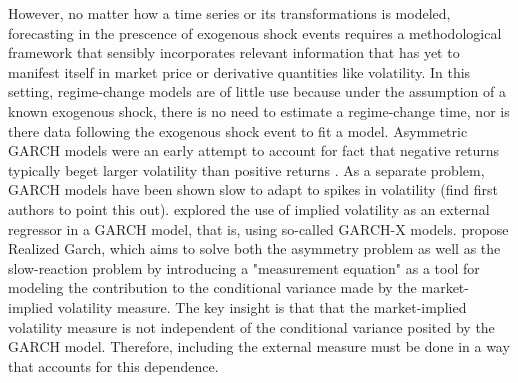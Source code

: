 \documentclass[11pt]{article}
\theoremstyle{definition}
\begin{document}

However, no matter how a time series or its transformations is modeled, forecasting in the prescence of exogenous shock events requires a methodological framework that sensibly incorporates relevant information that has yet to manifest itself in market price or derivative quantities like volatility.  In this setting, regime-change models are of little use because under the assumption of a known exogenous shock, there is no need to estimate a regime-change time, nor is there data following the exogenous shock event to fit a model.  Asymmetric GARCH models were an early attempt to account for fact that negative returns typically beget larger volatility than positive returns \citep{hansen2012realized}.  As a separate problem, GARCH models have been shown slow to adapt to spikes in volatility (find first authors to point this out).  \citet{engle2002new} explored the use of implied volatility as an external regressor in a GARCH model, that is, using so-called GARCH-X models. \citet{hansen2012realized} propose Realized Garch, which aims to solve both the asymmetry problem as well as the slow-reaction problem by introducing a "measurement equation" as a tool for modeling the contribution to the conditional variance made by the market-implied volatility measure.  The key insight is that that the market-implied volatility measure is not independent of the conditional variance posited by the GARCH model.  Therefore, including the external measure must be done in a way that accounts for this dependence.
\end{document}
